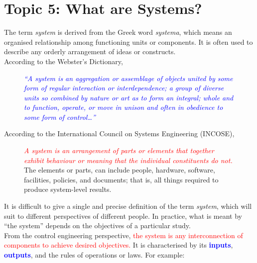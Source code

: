\documentclass[../notes-main.tex]{subfiles}
\begin{document}
\section{Topic 5: What are Systems?}
The term \emph{system} is derived from the Greek word \emph{systema}, which means an organised relationship among functioning units or components. It is often used to describe any orderly arrangement of ideas or constructs.\\
According to the Webster's Dictionary,
\begin{figure}[H]
    \centering
    \begin{mdframed}
        \begin{center}
            \textcolor{blue}{%
                \emph{``A system is an aggregation or assemblage of objects united by some form of regular interaction or interdependence; a group of diverse units so combined by nature or art as to form an integral; whole and to function, operate, or move in unison and often in obedience to some form of control\dots''}}
        \end{center}
    \end{mdframed}\label{fig:system-def-1}
    \vspace{-1em}
\end{figure}
\noindent According to the International Council on Systems Engineering (INCOSE),
\begin{figure}[H]
    \centering
    \begin{mdframed}
        \begin{center}
            \textcolor{red}{%
                \emph{A system is an arrangement of parts or elements that together exhibit behaviour or meaning that the individual constituents do not.}}\\ The elements or parts, can include people, hardware, software, facilities, policies, and documents; that is, all things required to produce system-level results.
        \end{center}
    \end{mdframed}\label{fig:system-def-2}
    \vspace{-1em}
\end{figure}
\noindent It is difficult to give a single and precise definition of the term \emph{system}, which will suit to different perspectives of different people. In practice, what is meant by ``the system'' depends on the objectives of a particular study.\\
From the control engineering perspective, \textcolor{red}{the system is any interconnection of components to achieve desired objectives.} It is characterised by its \textbf{\textcolor{blue}{inputs}}, \textbf{\textcolor{blue}{outputs}}, and the rules of operations or laws. For example:
\end{document}
